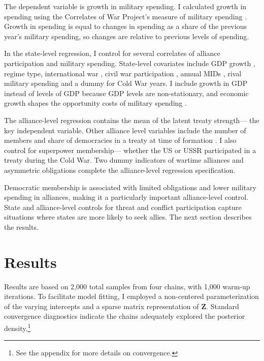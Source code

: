 \documentclass[12pt]{article}
\begin{document}
The dependent variable is growth in military spending.
I calculated growth in spending using the Correlates of War Project's measure of military spending \citep{SingerCINC1988}. 
Growth in spending is equal to changes in spending as a share of the previous year's military spending, so changes are relative to previous levels of spending. 


In the state-level regression, I control for several correlates of alliance participation and military spending. 
State-level covariates include GDP growth \citep{Boltetal2018}, regime type, international war \citep{Reiteretal2016}, civil war participation \citep{SarkeesWayman2010}, annual MIDs \citep{Gibleretal2016}, rival military spending \citep{ThompsonDreyer2012} and a dummy for Cold War years.
I include growth in GDP instead of levels of GDP because GDP levels are non-stationary, and economic growth shapes the opportunity costs of military spending \citep{Kimball2010, Zielinskietal2017}.


The alliance-level regression contains the mean of the latent treaty strength--- the key independent variable. 
Other alliance level variables include the number of members and share of democracies in a treaty at time of formation \citep{Chibaetal2015}.
I also control for superpower membership--- whether the US or USSR participated in a treaty during the Cold War. 
Two dummy indicators of wartime alliances and asymmetric obligations \citep{Leedsetal2002} complete the alliance-level regression specification. 


Democratic membership is associated with limited obligations \citep{Chibaetal2015} and lower military spending \citep{DigiuseppePoast2016} in alliances, making it a particularly important alliance-level control.  
State and alliance-level controls for threat and conflict participation capture situations where states are more likely to seek allies. 
The next section describes the results.
 

\section{Results}


Results are based on 2,000 total samples from four chains, with 1,000 warm-up iterations. 
To facilitate model fitting, I employed a non-centered parameterization of the varying intercepts and a sparse matrix representation of \textbf{Z}. 
Standard convergence diagnostics indicate the chains adequately explored the posterior density.\footnote{See the appendix for more details on convergence.} 
\end{document}
